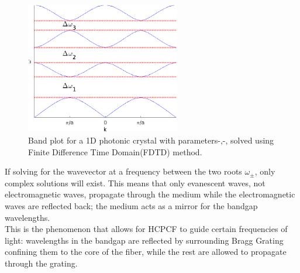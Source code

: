 \begin{figure}[h]
	\centering
	\includegraphics[width=0.6\textwidth]{./Figures/HCPCF/1D_BandGap.png}
	\caption {Band plot for a 1D photonic crystal with parameters-,-, solved using Finite Difference Time Domain(FDTD) method\cite{sukhoivanov}.}
	\label{fig:1dbp}
\end{figure}

If solving for the wavevector at a frequency between the two roots $\omega_{\pm}$, only complex solutions will exist. This means that only evanescent waves, not electromagnetic waves, propagate through the medium while the electromagnetic waves are reflected back; the medium acts as a mirror for the bandgap wavelengths.\\
This is the phenomenon that allows for HCPCF to guide certain frequencies of light: wavelengths in the bandgap are reflected by surrounding Bragg Grating confining them to the core of the fiber, while the rest are allowed to propagate through the grating. 


